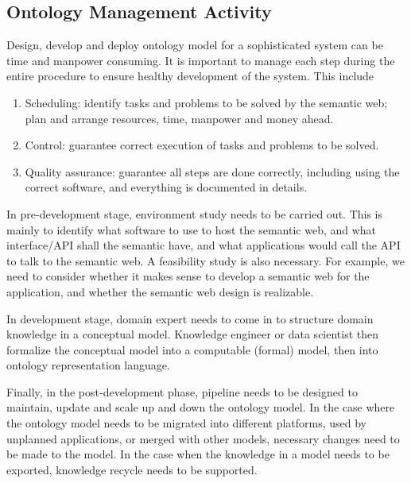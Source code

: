 \subsection{Ontology Management Activity}

Design, develop and deploy ontology model for a sophisticated system can be time and manpower consuming. It is important to manage each step during the entire procedure to ensure healthy development of the system. This include
\begin{enumerate}
	\item Scheduling: identify tasks and problems to be solved by the semantic web; plan and arrange resources, time, manpower and money ahead.
	\item Control: guarantee correct execution of tasks and problems to be solved.
	\item Quality assurance: guarantee all steps are done correctly, including using the correct software, and everything is documented in details.
\end{enumerate}

In pre-development stage, environment study needs to be carried out. This is mainly to identify what software to use to host the semantic web, and what interface/API shall the semantic have, and what applications would call the API to talk to the semantic web. A feasibility study is also necessary. For example, we need to consider whether it makes sense to develop a semantic web for the application, and whether the semantic web design is realizable.

In development stage, domain expert needs to come in to structure domain knowledge in a conceptual model. Knowledge engineer or data scientist then formalize the conceptual model into a computable (formal) model, then into ontology representation language.

Finally, in the post-development phase, pipeline needs to be designed to maintain, update and scale up and down the ontology model. In the case where the ontology model needs to be migrated into different platforms, used by unplanned applications, or merged with other models, necessary changes need to be made to the model. In the case when the knowledge in a model needs to be exported, knowledge recycle needs to be supported. 

